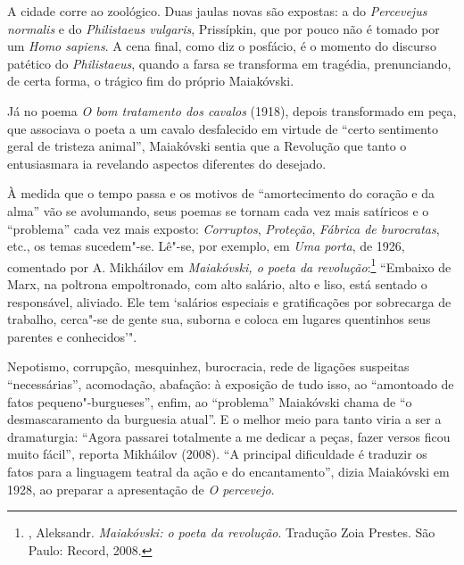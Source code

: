 {A cidade corre ao zoológico. Duas jaulas novas são expostas: a do
\emph{Percevejus normalis} e do \emph{Philistaeus vulgaris},
Prissípkin, que por pouco não é tomado por um \emph{Homo sapiens}. A
cena final, como diz o posfácio, é o momento do discurso patético do
\emph{Philistaeus}, quando a farsa se transforma em tragédia,
prenunciando, de certa forma, o trágico fim do próprio Maiakóvski.

Já no poema \emph{O bom tratamento dos cavalos} (1918), depois
transformado em peça, que associava o poeta a um cavalo desfalecido em
virtude de ``certo sentimento geral de tristeza animal'', Maiakóvski
sentia que a Revolução que tanto o entusiasmara ia revelando aspectos
diferentes do desejado.

À medida que o tempo passa e os motivos de ``amortecimento do coração e
da alma'' vão se avolumando, seus poemas se tornam cada vez mais
satíricos e o ``problema'' cada vez mais exposto: \emph{Corruptos},
\emph{Proteção}, \emph{Fábrica de burocratas}, etc., os temas
sucedem"-se. Lê"-se, por exemplo, em \emph{Uma porta}, de 1926, comentado
por A. Mikháilov em \emph{Maiakóvski, o poeta da revolução}:\footnote{,
  Aleksandr. \emph{Maiakóvski: o poeta da revolução}. Tradução Zoia
  Prestes. São Paulo: Record, 2008.} ``Embaixo de Marx, na poltrona
empoltronado, com alto salário, alto e liso, está sentado o responsável,
aliviado. Ele tem `salários especiais e gratificações por sobrecarga de
trabalho, cerca"-se de gente sua, suborna e coloca em lugares quentinhos
seus parentes e conhecidos'".

Nepotismo, corrupção, mesquinhez, burocracia, rede de ligações suspeitas
``necessárias'', acomodação, abafação: à exposição de tudo isso, ao
``amontoado de fatos pequeno"-burgueses'', enfim, ao ``problema'' Maiakóvski
chama de ``o desmascaramento da burguesia atual''. E o melhor meio para
tanto viria a ser a dramaturgia: ``Agora passarei totalmente a me dedicar
a peças, fazer versos ficou muito fácil'', reporta Mikháilov (2008). ``A
principal dificuldade é traduzir os fatos para a linguagem teatral da
ação e do encantamento'', dizia Maiakóvski em 1928, ao preparar a
apresentação de \emph{O percevejo}.

}
